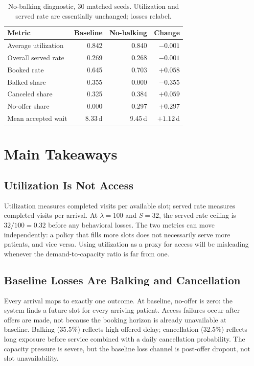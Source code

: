 \documentclass[10pt]{article}
\begin{document}
\begin{table}[h!]
\centering
\small
\renewcommand{\arraystretch}{1.10}
\begin{tabularx}{\textwidth}{Yrrr}
\toprule
Metric & Baseline & No-balking & Change \\
\midrule
Average utilization & 0.842 & 0.840 & \(-0.001\) \\
Overall served rate & 0.269 & 0.268 & \(-0.001\) \\
Booked rate         & 0.645 & 0.703 & \(+0.058\) \\
Balked share        & 0.355 & 0.000 & \(-0.355\) \\
Canceled share      & 0.325 & 0.384 & \(+0.059\) \\
No-offer share      & 0.000 & 0.297 & \(+0.297\) \\
Mean accepted wait  & 8.33\,d & 9.45\,d & \(+1.12\,\)d \\
\bottomrule
\end{tabularx}
\caption{No-balking diagnostic, 30 matched seeds.
  Utilization and served rate are essentially unchanged; losses relabel.}
\label{tab:nobalking}
\end{table}

\section*{Main Takeaways}

\subsection*{Utilization Is Not Access}

Utilization measures completed visits per available slot; served rate measures
completed visits per arrival. At \(\lambda=100\) and \(S=32\), the served-rate
ceiling is \(32/100=0.32\) before any behavioral losses. The two metrics can
move independently: a policy that fills more slots does not necessarily serve
more patients, and vice versa. Using utilization as a proxy for access will
be misleading whenever the demand-to-capacity ratio is far from one.

\subsection*{Baseline Losses Are Balking and Cancellation}

Every arrival maps to exactly one outcome. At baseline, no-offer is zero: the
system finds a future slot for every arriving patient. Access failures occur
after offers are made, not because the booking horizon is already unavailable
at baseline. Balking (35.5\%) reflects high offered delay; cancellation
(32.5\%) reflects long exposure before service combined with a daily
cancellation probability. The capacity pressure is severe, but the baseline
loss channel is post-offer dropout, not slot unavailability.
\end{document}
